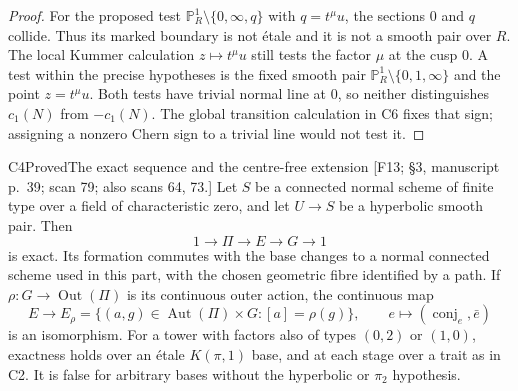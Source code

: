 \begin{proof}
For the proposed test $\mathbb P^1_R\setminus\{0,\infty,q\}$ with
$q=t^\mu u$, the sections $0$ and $q$ collide. Thus its marked boundary
is not \'etale and it is not a smooth pair over $R$. The local Kummer
calculation $z\mapsto t^\mu u$ still tests the factor $\mu$ at the cusp
$0$. A test within the precise hypotheses is the fixed smooth pair
$\mathbb P^1_R\setminus\{0,1,\infty\}$ and the point $z=t^\mu u$.
Both tests have trivial normal line at $0$, so neither distinguishes
$c_1(N)$ from $-c_1(N)$. The global transition calculation in C6 fixes
that sign; assigning a nonzero Chern sign to a trivial line would not
test it.
\end{proof}

\begin{result}{C4}{Proved}{The exact sequence and the centre-free extension}
\textup{[F13; \S3, manuscript p.\ 39; scan 79; also scans 64, 73.]}
Let $S$ be a connected normal scheme of finite type over a field of
characteristic zero, and let $U\to S$ be a hyperbolic smooth pair. Then
\[
 1\longrightarrow\Pi\longrightarrow E\longrightarrow G\longrightarrow1
 \tag{C.3}
\]
is exact. Its formation commutes with the base changes to a normal
connected scheme used in this part, with the chosen geometric fibre
identified by a path. If $\rho:G\to\operatorname{Out}(\Pi)$ is its
continuous outer action, the continuous map
\[
 E\longrightarrow
 E_\rho=\{(a,g)\in\operatorname{Aut}(\Pi)\times G:
               [a]=\rho(g)\},\qquad
 e\longmapsto(\operatorname{conj}_e,\bar e)
 \tag{C.4}
\]
is an isomorphism. For a tower with factors also of types $(0,2)$ or
$(1,0)$, exactness holds over an \'etale $K(\pi,1)$ base, and at each
stage over a trait as in C2. It is false for arbitrary bases without
the hyperbolic or $\pi_2$ hypothesis.
\end{result}

